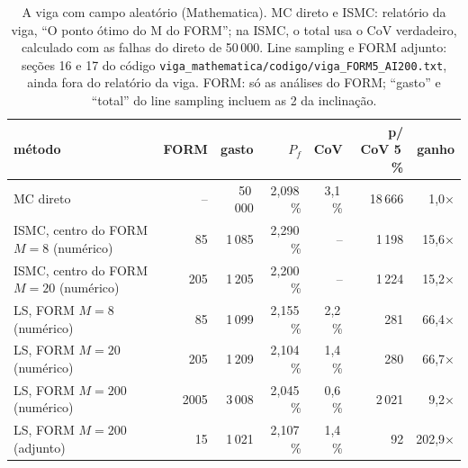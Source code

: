 \begin{table}[H]\centering\small
\caption{A viga com campo aleatório (Mathematica). MC direto e ISMC: relatório da viga, ``O ponto ótimo do M do FORM''; na ISMC, o total usa o CoV verdadeiro, calculado com as falhas do direto de 50\,000. Line sampling e FORM adjunto: seções 16 e 17 do código \texttt{viga\_mathematica/codigo/viga\_FORM5\_AI200.txt}, ainda fora do relatório da viga. FORM: só as análises do FORM; ``gasto'' e ``total'' do line sampling incluem as 2 da inclinação.}\label{tab:viga}
\begin{tabular}{lrrrrrr}\toprule
método & FORM & gasto & $P_f$ & CoV & p/ CoV 5\,\% & ganho \\\midrule
MC direto & -- & 50\,000 & 2,098\,\% & 3,1\,\% & 18\,666 & 1,0× \\
ISMC, centro do FORM $M = 8$ (numérico) & 85 & 1\,085 & 2,290\,\% & -- & 1\,198 & 15,6× \\
ISMC, centro do FORM $M = 20$ (numérico) & 205 & 1\,205 & 2,200\,\% & -- & 1\,224 & 15,2× \\
LS, FORM $M = 8$ (numérico) & 85 & 1\,099 & 2,155\,\% & 2,2\,\% & 281 & 66,4× \\
LS, FORM $M = 20$ (numérico) & 205 & 1\,209 & 2,104\,\% & 1,4\,\% & 280 & 66,7× \\
LS, FORM $M = 200$ (numérico) & 2005 & 3\,008 & 2,045\,\% & 0,6\,\% & 2\,021 & 9,2× \\
LS, FORM $M = 200$ (adjunto) & 15 & 1\,021 & 2,107\,\% & 1,4\,\% & 92 & 202,9× \\
\bottomrule\end{tabular}\end{table}

